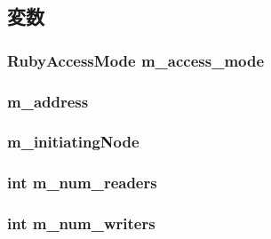 \subsection{変数}
\hypertarget{classCheck_a519d9b4ec6b00fb1f4cfc481ee37121e}{
\subsubsection[{m\_\-access\_\-mode}]{\setlength{\rightskip}{0pt plus 5cm}RubyAccessMode {\bf m\_\-access\_\-mode}}}
\label{classCheck_a519d9b4ec6b00fb1f4cfc481ee37121e}
\hypertarget{classCheck_a9fc76d7db60d4f05200f8248a697ea28}{
\subsubsection[{m\_\-address}]{ {\bf m\_\-address}}}
\label{classCheck_a9fc76d7db60d4f05200f8248a697ea28}
\hypertarget{classCheck_a126a08ce5cd6fa00a0327f01957bd420}{
\subsubsection[{m\_\-initiatingNode}]{ {\bf m\_\-initiatingNode}}}
\label{classCheck_a126a08ce5cd6fa00a0327f01957bd420}
\hypertarget{classCheck_a7d224a04c5f0d1049dd6c6ab070884cb}{
\subsubsection[{m\_\-num\_\-readers}]{\setlength{\rightskip}{0pt plus 5cm}int {\bf m\_\-num\_\-readers}}}
\label{classCheck_a7d224a04c5f0d1049dd6c6ab070884cb}
\hypertarget{classCheck_aedeaccd67403213e1e43d99ff1c70f44}{
\subsubsection[{m\_\-num\_\-writers}]{\setlength{\rightskip}{0pt plus 5cm}int {\bf m\_\-num\_\-writers}}}
